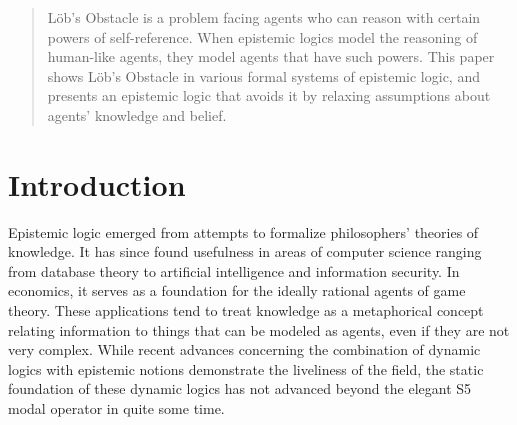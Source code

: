 
\author{Seth Ahrenbach         \and
        Second Author %
}



\date{Received: date / Accepted: date}


\maketitle

\begin{abstract}
L\"ob's Obstacle is a problem facing agents who can reason with certain powers of self-reference. When epistemic logics model the reasoning of human-like agents, they model agents that have such powers. This paper shows L\"ob's Obstacle in various formal systems of epistemic logic, and presents an epistemic logic that avoids it by relaxing assumptions about agents' knowledge and belief. 
\end{abstract}

\section{Introduction}
\label{intro}
Epistemic logic emerged from attempts to formalize philosophers' theories of knowledge. It has since found usefulness in areas of computer science ranging from database theory to artificial intelligence and information security. In economics, it serves as a foundation for the ideally rational agents of game theory. These applications tend to treat knowledge as a metaphorical concept relating information to things that can be modeled as agents, even if they are not very complex. While recent advances concerning the combination of dynamic logics with epistemic notions demonstrate the liveliness of the field, the static foundation of these dynamic logics has not advanced beyond the elegant S5 modal operator in quite some time. 

